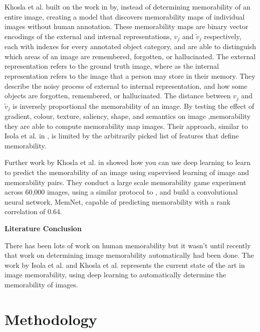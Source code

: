 \documentclass{UoYCSproject}
\begin{document}
Khosla et al. \cite{NIPS12_Khosla} built on the work in \cite{Isola2011, IsolaParikhTorralbaOliva2011} by, instead of determining memorability of an entire image, creating a model that discovers memorability maps of individual images without human annotation. These memorability maps are binary vector encodings of the external and internal representations, $v_j$ and $\tilde{v}_j$ respectively, each with indexes for every annotated object category, and are able to distinguish which areas of an image are remembered, forgotten, or hallucinated. The external representation refers to the ground truth image, where as the internal representation refers to the image that a person may store in their memory. They describe the noisy process of external to internal representation, and how some objects are forgotten, remembered, or hallucinated. The distance between $v_j$ and $\tilde{v}_j$ is inversely proportional the memorability of an image. By testing the effect of gradient, colour, texture, saliency, shape, and semantics on image ,memorability they are able to compute memorability map images. Their approach, similar to Isola et al. in \cite{Isola2011, IsolaParikhTorralbaOliva2011}, is limited by the arbitrarily picked list of features that define memorability.  

Further work by Khosla et al. in \cite{ICCV15_Khosla} showed how you can use deep learning to learn to predict the memorability of an image using supervised learning of image and memorability pairs. They conduct a large scale memorability game experiment across 60,000 images, using a similar protocol to \cite{isola2014memorability}, and build a convolutional neural network, MemNet, capable of predicting memorability with a rank correlation of 0.64.  

\textbf{Literature Conclusion}

There has been lots of work on human memorability but it wasn't until recently that work on determining image memorability automatically had been done. The work by Isola et al. \cite{Isola2011,IsolaParikhTorralbaOliva2011} and Khosla et al. \cite{ICCV15_Khosla} represents the current state of the art in image memorability, using deep learning to automatically determine the memorability of images.

\chapter{Methodology}

\end{document}
